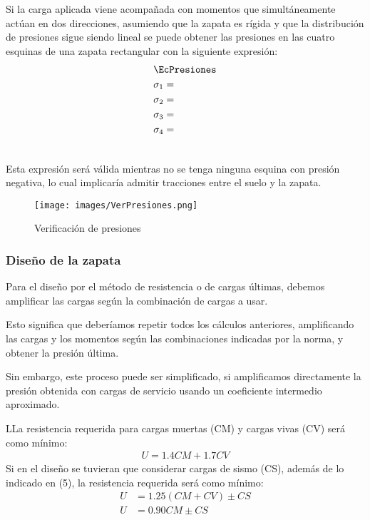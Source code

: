 Si la carga aplicada viene acompañada con momentos que simultáneamente actúan en dos direcciones, asumiendo que la zapata es rígida y que la distribución de presiones sigue siendo lineal se puede obtener las presiones en las cuatro esquinas de una zapata rectangular con la siguiente expresión:
\begin{align}
	&\EcPresiones \\ \nonumber
	&\sigma_1 =\\ \nonumber
	&\sigma_2 =\\ \nonumber
	&\sigma_3 =\\ \nonumber
	&\sigma_4 =\\ \nonumber
\end{align}

Esta expresión será válida mientras no se tenga ninguna esquina con presión negativa,
lo cual implicaría admitir tracciones entre el suelo y la zapata.

\begin{figure}[H]
    \centering
    \texttt{[image: images/VerPresiones.png]}
    \caption{Verificación de presiones}
    \label{fig:my_label}
\end{figure}

\subsubsection{Diseño de la zapata}

Para el diseño por el método de resistencia o de cargas últimas, debemos amplificar las cargas según la combinación de cargas a usar.

Esto significa que deberíamos repetir todos los cálculos anteriores, amplificando las cargas y los momentos según las combinaciones indicadas por la norma, y obtener la presión última.

Sin embargo, este proceso puede ser simplificado, si amplificamos directamente la presión obtenida con cargas de servicio usando un coeficiente intermedio aproximado.

\begin{theo}
    LLa resistencia requerida para cargas muertas (CM) y cargas vivas (CV) será como mínimo:
    \begin{align}
        U = 1.4CM + 1.7CV
    \end{align}
    Si en el diseño se tuvieran que considerar cargas de sismo (CS), además de lo indicado en (5), la resistencia requerida será como mínimo:
    \begin{align}
        U &= 1.25(CM + CV) \pm CS\\
        U &= 0.90CM \pm CS
    \end{align}
\end{theo}


